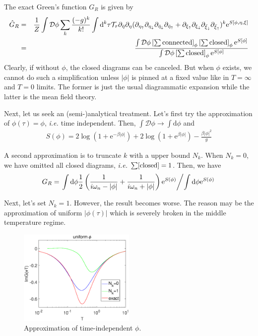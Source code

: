 \documentclass[12pt]{article}
\newcommand{\bea}{\begin{eqnarray}}
\newcommand{\eea}{\end{eqnarray}}
\newcommand{\md}{\mathrm{d}}
\newcommand{\ie}{\textit{i.e.{ }}}
\newcommand{\me}{\mathrm{e}}
\begin{document}
The exact Green's function $G_R$ is given by
\bea \hat{G}_R&=&\frac{1}{Z}\int \mathcal{D}\phi \sum_k \frac{(-g)^k}{k!} \int\md^k\tau\mathcal{T}_\tau \partial_{\bar{\eta}} \partial_\eta (\partial_{\eta_\uparrow}\partial_{\eta_\downarrow}\partial_{\bar{\eta}_\downarrow}\partial_{\bar{\eta}_\uparrow}+\partial_{\xi_\uparrow}\partial_{\xi_\downarrow}\partial_{\bar{\xi}_\downarrow}\partial_{\bar{\xi}_\uparrow})^k \me^{S[\phi,\eta,\xi]} \\
&=&\frac{\int\mathcal{D}\phi \left[\sum {\rm connected}\right]_\phi\left[\sum {\rm closed}\right]_\phi \me^{S[\phi]} }{\int\mathcal{D}\phi \left[\sum {\rm closed}\right]_\phi \me^{S[\phi]}}
\eea
Clearly, if without $\phi$, the closed diagrams can be canceled. But when $\phi$ exists, we cannot do such a simplification unless $|\phi|$ is pinned at a fixed value like in $T=\infty$ and $T=0$ limits. The former is just the usual diagrammatic expansion while the latter is the mean field theory. 

Next, let us seek an (semi-)analytical treatment. Let's first try the approximation of $\phi(\tau)=\phi$, \ie time independent. Then, $\int \mathcal{D}\phi\rightarrow\int\md\phi$ and
\bea S(\phi)=2\log(1+\me^{-\beta|\phi|})+2\log(1+\me^{\beta|\phi|})-\frac{\beta|\phi|^2}{g} \eea  

A second approximation is to truncate $k$ with a upper bound $N_k$. When $N_k=0$, we have omitted all closed diagrams, \ie $\sum[{\rm closed}]=1$. Then, we have
\bea G_R=\left. \int\md \phi \frac{1}{2}\left(\frac{1}{i\omega_n-|\phi|}+\frac{1}{i\omega_n+|\phi|}\right) \me^{S(\phi)}  \middle/ \int\md  \phi \me^{S(\phi)}\right. \eea

Next, let's set $N_k=1$. However, the result becomes worse. The reason may be the approximation of uniform $|\phi(\tau)|$ which is severely broken in the middle temperature regime.  
\begin{figure}
    \begin{center}
    \includegraphics[width=0.5\textwidth]{uniformphi.eps}
    \caption{Approximation of time-independent $\phi$.}
    \end{center}
\end{figure}
\end{document}

